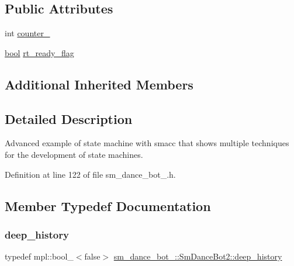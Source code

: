 \subsection*{Public Attributes}
\begin{DoxyCompactItemize}
\item 
int \hyperlink{structsm__dance__bot__2_1_1SmDanceBot2_a37bab7336653c009ad8a3e31c596b132}{counter\+\_}
\item 
\hyperlink{classbool}{bool} \hyperlink{structsm__dance__bot__2_1_1SmDanceBot2_a864092503acb358517e58bb8db064cbe}{rt\+\_\+ready\+\_\+flag}
\end{DoxyCompactItemize}
\subsection*{Additional Inherited Members}


\subsection{Detailed Description}
Advanced example of state machine with smacc that shows multiple techniques for the development of state machines. 

Definition at line 122 of file sm\+\_\+dance\+\_\+bot\+\_.\+h.



\subsection{Member Typedef Documentation}
\mbox{\label{structsm__dance__bot__2_1_1SmDanceBot2_af2705978b4ad0ad249c794c36deec888}} 
\subsubsection{\texorpdfstring{deep\+\_\+history}{deep\_history}}
{\footnotesize\ttfamily typedef mpl\+::bool\+\_\+$<$false$>$ \hyperlink{structsm__dance__bot__2_1_1SmDanceBot2_af2705978b4ad0ad249c794c36deec888}{sm\+\_\+dance\+\_\+bot\+\_\+::\+Sm\+Dance\+Bot2\+::deep\+\_\+history}}




